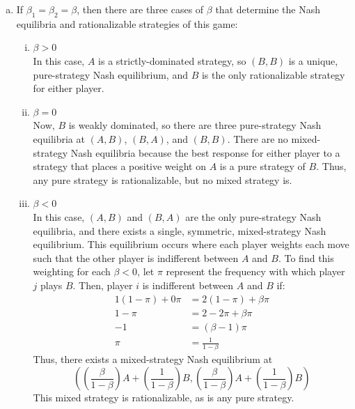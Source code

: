\documentclass{article}
\begin{document}
\begin{enumerate}[(a)]
	\item If $\beta_1=\beta_2=\beta$, then there are three cases of $\beta$ that determine the Nash equilibria and rationalizable strategies of this game:
		\begin{enumerate}[(i)]
			\item ${\beta>0}$ \\
				In this case, $A$ is a strictly-dominated strategy, so $(B,B)$ is a unique, pure-strategy Nash equilibrium, and $B$ is the only rationalizable strategy for either player.
				
			\item ${\beta=0}$ \\
				Now, $B$ is weakly dominated, so there are three pure-strategy Nash equilibria at $(A,B)$, $(B,A)$, and $(B,B)$. There are no mixed-strategy Nash equilibria because the best response for either player to a strategy that places a positive weight on $A$ is a pure strategy of $B$. Thus, any pure strategy is rationalizable, but no mixed strategy is.
			
			\item ${\beta<0}$ \\
				In this case, $(A,B)$ and $(B,A)$ are the only pure-strategy Nash equilibria, and there exists a single, symmetric, mixed-strategy Nash equilibrium. This equilibrium occurs where each player weights each move such that the other player is indifferent between $A$ and $B$. To find this weighting for each ${\beta<0}$, let $\pi$ represent the frequency with which player $j$ plays $B$. Then, player $i$ is indifferent between $A$ and $B$ if:
					\begin{align*}
						1(1-\pi) + 0\pi &= 2(1-\pi) + \beta\pi	\\
						1 - \pi &= 2 - 2\pi + \beta\pi 	\\
						-1 &= (\beta-1)\pi 	\\
						\pi &= \frac{1}{1-\beta}
					\end{align*}
				Thus, there exists a mixed-strategy Nash equilibrium at 
				\[
					\left(\left(\frac{\beta}{1-\beta}\right)A + \left(\frac{1}{1-\beta}\right)B,\left(\frac{\beta}{1-\beta}\right)A+\left(\frac{1}{1-\beta}\right)B\right)
				\]
				This mixed strategy is rationalizable, as is any pure strategy.
			
		\end{enumerate}
	

\end{enumerate}
\end{document}
